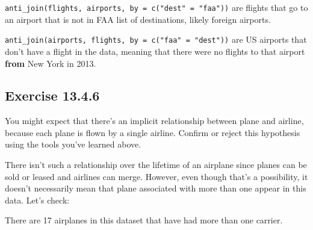 \documentclass[]{book}
\newenvironment{Shaded}{\begin{snugshade}}{\end{snugshade}}
\newcommand{\CommentTok}[1]{\textcolor[rgb]{0.56,0.35,0.01}{\textit{#1}}}
\newcommand{\DecValTok}[1]{\textcolor[rgb]{0.00,0.00,0.81}{#1}}
\newcommand{\KeywordTok}[1]{\textcolor[rgb]{0.13,0.29,0.53}{\textbf{#1}}}
\newcommand{\NormalTok}[1]{#1}
\newcommand{\OperatorTok}[1]{\textcolor[rgb]{0.81,0.36,0.00}{\textbf{#1}}}
\newcommand{\StringTok}[1]{\textcolor[rgb]{0.31,0.60,0.02}{#1}}
\theoremstyle{plain}
\theoremstyle{remark}
\theoremstyle{definition}
\theoremstyle{definition}
\theoremstyle{definition}
\theoremstyle{remark}
\begin{document}
\texttt{anti\_join(flights,\ airports,\ by\ =\ c("dest"\ =\ "faa"))} are
flights that go to an airport that is not in FAA list of destinations,
likely foreign airports.

\texttt{anti\_join(airports,\ flights,\ by\ =\ c("faa"\ =\ "dest"))} are
US airports that don't have a flight in the data, meaning that there
were no flights to that airport \textbf{from} New York in 2013.

\hypertarget{exercise-13.4.6}{%
\subsection*{\texorpdfstring{Exercise
{13.4.6}}{Exercise 13.4.6}}\label{exercise-13.4.6}}

You might expect that there's an implicit relationship between plane and
airline, because each plane is flown by a single airline. Confirm or
reject this hypothesis using the tools you've learned above.

There isn't such a relationship over the lifetime of an airplane since
planes can be sold or leased and airlines can merge. However, even
though that's a possibility, it doesn't necessarily mean that plane
associated with more than one appear in this data. Let's check:

\begin{Shaded}
\end{Shaded}

There are 17 airplanes in this dataset that have had more than one
carrier.
\end{document}
